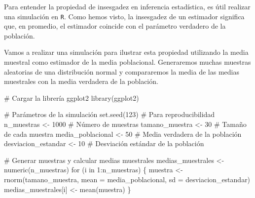 \documentclass[
  letterpaper,
  DIV=11,
  numbers=noendperiod]{scrreprt}
\newenvironment{Shaded}{\begin{snugshade}}{\end{snugshade}}
\newcommand{\AttributeTok}[1]{\textcolor[rgb]{0.40,0.45,0.13}{#1}}
\newcommand{\CommentTok}[1]{\textcolor[rgb]{0.37,0.37,0.37}{#1}}
\newcommand{\ControlFlowTok}[1]{\textcolor[rgb]{0.00,0.23,0.31}{#1}}
\newcommand{\DecValTok}[1]{\textcolor[rgb]{0.68,0.00,0.00}{#1}}
\newcommand{\FunctionTok}[1]{\textcolor[rgb]{0.28,0.35,0.67}{#1}}
\newcommand{\NormalTok}[1]{\textcolor[rgb]{0.00,0.23,0.31}{#1}}
\newcommand{\OtherTok}[1]{\textcolor[rgb]{0.00,0.23,0.31}{#1}}
\newcommand{\SpecialCharTok}[1]{\textcolor[rgb]{0.37,0.37,0.37}{#1}}
\begin{document}
\begin{tcolorbox}[enhanced jigsaw, arc=.35mm, breakable, coltitle=black, left=2mm, opacityback=0, bottomtitle=1mm, colbacktitle=quarto-callout-tip-color!10!white, title=\textcolor{quarto-callout-tip-color}{\faLightbulb}\hspace{0.5em}{Ejemplo Práctico. Insesgadez}, titlerule=0mm, colback=white, colframe=quarto-callout-tip-color-frame, bottomrule=.15mm, rightrule=.15mm, opacitybacktitle=0.6, toptitle=1mm, toprule=.15mm, leftrule=.75mm]

Para entender la propiedad de insesgadez en inferencia estadística, es
útil realizar una simulación en \texttt{R}. Como hemos visto, la
insesgadez de un estimador significa que, en promedio, el estimador
coincide con el parámetro verdadero de la población.

Vamos a realizar una simulación para ilustrar esta propiedad utilizando
la media muestral como estimador de la media poblacional. Generaremos
muchas muestras aleatorias de una distribución normal y compararemos la
media de las medias muestrales con la media verdadera de la población.

\begin{Shaded}
\begin{Highlighting}[]
\CommentTok{\# Cargar la librería ggplot2}
\FunctionTok{library}\NormalTok{(ggplot2)}

\CommentTok{\# Parámetros de la simulación}
\FunctionTok{set.seed}\NormalTok{(}\DecValTok{123}\NormalTok{)  }\CommentTok{\# Para reproducibilidad}
\NormalTok{n\_muestras }\OtherTok{\textless{}{-}} \DecValTok{1000}  \CommentTok{\# Número de muestras}
\NormalTok{tamano\_muestra }\OtherTok{\textless{}{-}} \DecValTok{30}  \CommentTok{\# Tamaño de cada muestra}
\NormalTok{media\_poblacional }\OtherTok{\textless{}{-}} \DecValTok{50}  \CommentTok{\# Media verdadera de la población}
\NormalTok{desviacion\_estandar }\OtherTok{\textless{}{-}} \DecValTok{10}  \CommentTok{\# Desviación estándar de la población}

\CommentTok{\# Generar muestras y calcular medias muestrales}
\NormalTok{medias\_muestrales }\OtherTok{\textless{}{-}} \FunctionTok{numeric}\NormalTok{(n\_muestras)}
\ControlFlowTok{for}\NormalTok{ (i }\ControlFlowTok{in} \DecValTok{1}\SpecialCharTok{:}\NormalTok{n\_muestras) \{}
\NormalTok{  muestra }\OtherTok{\textless{}{-}} \FunctionTok{rnorm}\NormalTok{(tamano\_muestra, }\AttributeTok{mean =}\NormalTok{ media\_poblacional, }\AttributeTok{sd =}\NormalTok{ desviacion\_estandar)}
\NormalTok{  medias\_muestrales[i] }\OtherTok{\textless{}{-}} \FunctionTok{mean}\NormalTok{(muestra)}
\NormalTok{\}}


\end{Highlighting}
\end{Shaded}
\end{tcolorbox}
\end{document}
